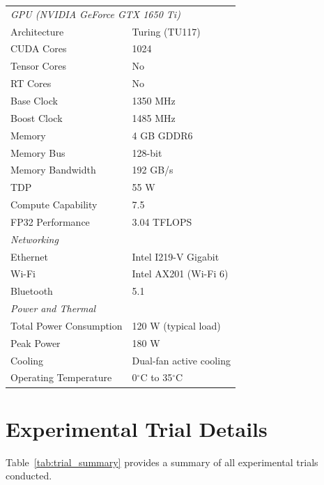 \begin{table}[htbp]
\begin{tabular}{@{}ll@{}}
\midrule
\multicolumn{2}{l}{\textit{GPU (NVIDIA GeForce GTX 1650 Ti)}} \\
Architecture & Turing (TU117) \\
CUDA Cores & 1024 \\
Tensor Cores & No \\
RT Cores & No \\
Base Clock & 1350 MHz \\
Boost Clock & 1485 MHz \\
Memory & 4 GB GDDR6 \\
Memory Bus & 128-bit \\
Memory Bandwidth & 192 GB/s \\
TDP & 55 W \\
Compute Capability & 7.5 \\
FP32 Performance & 3.04 TFLOPS \\
\midrule
\multicolumn{2}{l}{\textit{Networking}} \\
Ethernet & Intel I219-V Gigabit \\
Wi-Fi & Intel AX201 (Wi-Fi 6) \\
Bluetooth & 5.1 \\
\midrule
\multicolumn{2}{l}{\textit{Power and Thermal}} \\
Total Power Consumption & 120 W (typical load) \\
Peak Power & 180 W \\
Cooling & Dual-fan active cooling \\
Operating Temperature & 0$^\circ$C to 35$^\circ$C \\
\bottomrule
\end{tabular}
\end{table}

\clearpage

\section{Experimental Trial Details}
\label{sec:trial_details}

Table~\ref{tab:trial_summary} provides a summary of all experimental trials conducted.

